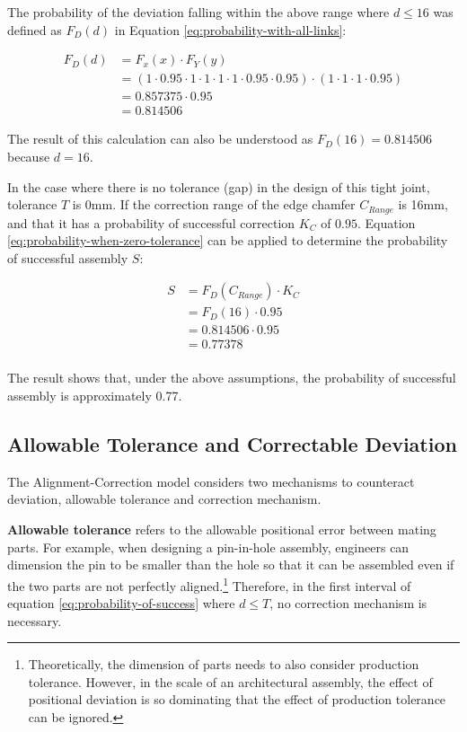 The probability of the deviation falling within the above range where $d \le 16$ was defined as $F_D(d)$ in Equation \ref{eq:probability-with-all-links}:

\begingroup\abovedisplayskip=-5pt \belowdisplayskip=10pt
\begin{align}
    F_D(d) &= F_x(x) \cdot F_Y(y) \nonumber\\
      &= (1 \cdot 0.95 \cdot 1 \cdot 1 \cdot 1 \cdot 1 \cdot 0.95 \cdot 0.95) \cdot (1 \cdot 1 \cdot 1 \cdot 0.95)\nonumber\\
      &= 0.857375 \cdot 0.95\nonumber\\
      &= 0.814506\nonumber
\end{align}
\endgroup

The result of this calculation can also be understood as $F_D(16) = 0.814506$ because $d = 16$.

In the case where there is no tolerance (gap) in the design of this tight joint, tolerance $T$ is 0mm. If the correction range of the edge chamfer $C_{Range}$ is 16mm, and that it has a probability of successful correction $K_C$ of $0.95$. Equation \ref{eq:probability-when-zero-tolerance} can be applied to determine the probability of successful assembly $S$:

\begingroup\abovedisplayskip=-5pt \belowdisplayskip=10pt
\begin{align}
    S &= F_D(C_{Range}) \cdot K_C \nonumber\\
      &= F_D(16) \cdot 0.95 \nonumber\\
      &=  0.814506 \cdot 0.95 \nonumber\\
      &= 0.77378 \nonumber\\
\end{align}
\endgroup

The result shows that, under the above assumptions, the probability of successful assembly is approximately 0.77. 


\subsection{Allowable Tolerance and Correctable Deviation}
\label{subsection:new-hypo-allowable-tolerance-and-correctable-deviation}

The Alignment-Correction model considers two mechanisms to counteract deviation, allowable tolerance and correction mechanism.

\textbf{Allowable tolerance} refers to the allowable positional error between mating parts. For example, when designing a pin-in-hole assembly, engineers can dimension the pin to be smaller than the hole so that it can be assembled even if the two parts are not perfectly aligned.\footnote{Theoretically, the dimension of parts needs to also consider production tolerance. However, in the scale of an architectural assembly, the effect of positional deviation is so dominating that the effect of production tolerance can be ignored.} Therefore, in the first interval of equation \ref{eq:probability-of-success} where $ d \leq T$, no correction mechanism is necessary. 


